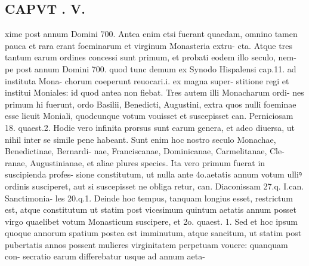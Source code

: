 \documentclass{article}
\begin{document}
\begin{pages}
\section*{CAPVT . V. }
\marginpar{[ p.293 ]}xime post annum Domini 700. Antea enim etsi fuerant quaedam, omnino tamen pauca et rara erant foeminarum et virginum Monasteria extru- cta. Atque tres tantum earum ordines concessi sunt primum, et probati eodem illo seculo, nem- pe post annum Domini 700. quod tunc demum ex Synodo Hispalensi cap.11. ad instituta Mona- chorum coeperunt reuocari.i. ex magna super- stitione regi et institui Moniales: id quod antea non fiebat. Tres autem illi Monacharum ordi- nes primum hi fuerunt, ordo Basilii, Benedicti, Augustini, extra quos nulli foeminae esse licuit Moniali, quodcunque votum vouisset et suscepisset can. Perniciosam 18. quaest.2. Hodie vero infinita prorsus sunt earum genera, et adeo diuersa, ut nihil inter se simile pene habeant. Sunt enim hoc nostro seculo Monachae, Benedictinae, Bernardi- nae, Franciscanae, Dominicanae, Carmelitanae, Cle- ranae, Augustinianae, et aliae plures species. Ita vero primum fuerat in suscipienda profes- sione constitutum, ut nulla ante 4o.aetatis annum votum ulliꝰ ordinis susciperet, aut si suscepisset ne obliga retur, can. Diaconissam 27.q. I.can. Sanctimonia- les 20.q.1. Deinde hoc tempus, tanquam longius esset, restrictum est, atque constitutum ut statim post vicesimum quintum aetatis annum posset virgo quaelibet votum Monasticum suscipere, et 2o. quaest. 1. Sed et hoc ipsum quoque annorum spatium postea est imminutum, atque sancitum, ut statim post pubertatis annos possent mulieres virginitatem perpetuam vouere: quanquam con- secratio earum differebatur usque ad annum aeta- 

\end{pages}
\end{document}
